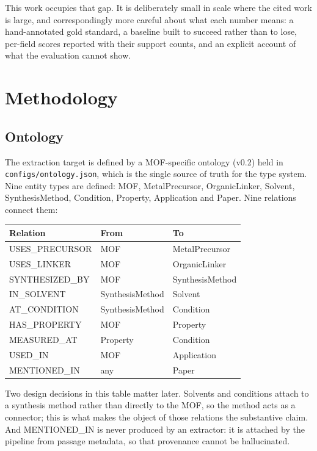 \documentclass[11pt,a4paper,oneside]{report}
\begin{document}
This work occupies that gap. It is deliberately small in scale where the cited work is large, and correspondingly more careful about what each number means: a hand-annotated gold standard, a baseline built to succeed rather than to lose, per-field scores reported with their support counts, and an explicit account of what the evaluation cannot show.


\chapter{Methodology}


\section{Ontology}

The extraction target is defined by a MOF-specific ontology (v0.2) held in \texttt{configs/\allowbreak{}ontology.\allowbreak{}json}, which is the single source of truth for the type system. Nine entity types are defined: MOF, MetalPrecursor, OrganicLinker, Solvent, SynthesisMethod, Condition, Property, Application and Paper. Nine relations connect them:

\par\medskip
\begingroup
\small\setlength{\tabcolsep}{6pt}
\begin{tabular}{@{}lll@{}}
\toprule
\textbf{Relation} & \textbf{From} & \textbf{To} \\
\midrule
USES\_PRECURSOR & MOF & MetalPrecursor \\
USES\_LINKER & MOF & OrganicLinker \\
SYNTHESIZED\_BY & MOF & SynthesisMethod \\
IN\_SOLVENT & SynthesisMethod & Solvent \\
AT\_CONDITION & SynthesisMethod & Condition \\
HAS\_PROPERTY & MOF & Property \\
MEASURED\_AT & Property & Condition \\
USED\_IN & MOF & Application \\
MENTIONED\_IN & any & Paper \\
\bottomrule
\end{tabular}
\endgroup
\par\medskip
Two design decisions in this table matter later. Solvents and conditions attach to a synthesis method rather than directly to the MOF, so the method acts as a connector; this is what makes the object of those relations the substantive claim. And MENTIONED\_IN is never produced by an extractor: it is attached by the pipeline from passage metadata, so that provenance cannot be hallucinated.
\end{document}
